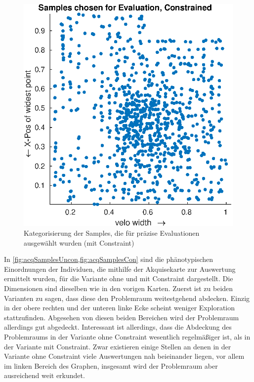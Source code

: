 \begin{figure}[h]
\begin{minipage}{0.45\textwidth}
		\includegraphics[width=1\linewidth]{bilder/6pt1000Samples/acqSamplesCon}
		\caption{Kategorisierung der Samples, die für präzise Evaluationen ausgewählt wurden (mit Constraint)}
		\label{fig:acqSamplesCon}
	\end{minipage}
\end{figure}

In \cref{fig:acqSamplesUncon,fig:acqSamplesCon} sind die phänotypischen Einordnungen der Individuen, die mithilfe der Akquisekarte zur Auswertung ermittelt wurden, für die Variante ohne und mit Constraint dargestellt.
Die Dimensionen sind dieselben wie in den vorigen Karten.
Zuerst ist zu beiden Varianten zu sagen, dass diese den Problemraum weitestgehend abdecken.
Einzig in der obere rechten und der unteren linke Ecke scheint weniger Exploration stattzufinden.
Abgesehen von diesen beiden Bereichen wird der Problemraum allerdings gut abgedeckt.
Interessant ist allerdings, dass die Abdeckung des Problemraums in der Variante ohne Constraint wesentlich regelmäßiger ist, als in der Variante mit Constraint.
Zwar existieren einige Stellen an denen in der Variante ohne Constraint viele Auswertungen nah beieinander liegen, vor allem im linken Bereich des Graphen, insgesamt wird der Problemraum aber ausreichend weit erkundet.

